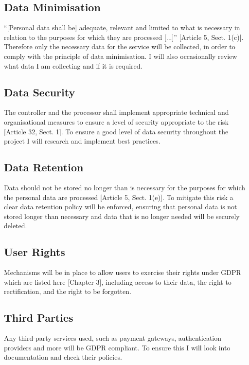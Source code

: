 \documentclass[]{project_report}
\begin{document}
\subsection{Data Minimisation}

“[Personal data shall be] adequate, relevant and limited to what is necessary in relation to the purposes for which they are processed [...]” \cite{gdpr_2016} [Article 5, Sect. 1(c)]. Therefore only the necessary data for the service will be collected, in order to comply with the principle of data minimisation. I will also occasionally review what data I am collecting and if it is required.

\subsection{Data Security}

The controller and the processor shall implement appropriate technical and organisational measures to ensure a level of security appropriate to the risk \cite{gdpr_2016} [Article 32, Sect. 1]. To ensure a good level of data security throughout the project I will research and implement best practices.

\subsection{Data Retention}

Data should not be stored no longer than is necessary for the purposes for which the personal data are processed \cite{gdpr_2016} [Article 5, Sect. 1(e)]. To mitigate this risk a clear data retention policy will be enforced, ensuring that personal data is not stored longer than necessary and data that is no longer needed will be securely deleted.

\subsection{User Rights}

Mechanisms will be in place to allow users to exercise their rights under GDPR which are listed here \cite{gdpr_2016} [Chapter 3], including access to their data, the right to rectification, and the right to be forgotten.

\subsection{Third Parties}

Any third-party services used, such as payment gateways, authentication providers and more will be GDPR compliant. To ensure this I will look into documentation and check their policies. \newline
\end{document}
